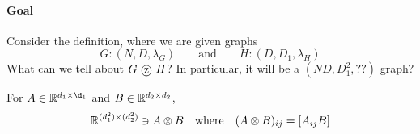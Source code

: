 \paragraph{Goal} Consider the definition, where we are given graphs
\begin{equation}
	G: (N, D, \lambda_G) \quad \quad 
	\text{and} \quad \quad H : (D, D_1, \lambda_H)
\end{equation}
What can we tell about $G \tcircle {z} H$? In particular, it will be a $(ND, D_1^2, ??)$ graph? 

\begin{definition}
	For $A \in \real^{d_1 \times \d_1}$ and $B \in \mathbb{R}^{d_2 \times d_2}$, 
	\begin{equation}
		\mathbb{R}^{(d_1^2 )\times (d_2^2)} \ni A \otimes B \quad \text{where} \quad (A \otimes B)_{ij} = [A_{ij}B]
	\end{equation}
\end{definition}

